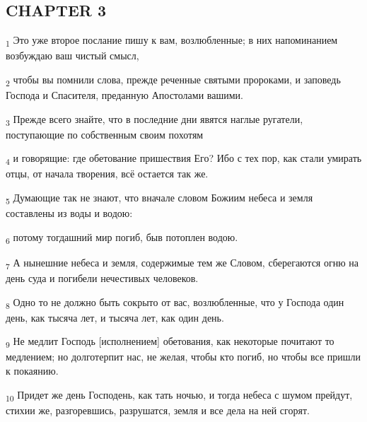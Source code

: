 \subsection{CHAPTER 3}
\begin{tcolorbox}
\textsubscript{1} Это уже второе послание пишу к вам, возлюбленные; в них напоминанием возбуждаю ваш чистый смысл,
\end{tcolorbox}
\begin{tcolorbox}
\textsubscript{2} чтобы вы помнили слова, прежде реченные святыми пророками, и заповедь Господа и Спасителя, преданную Апостолами вашими.
\end{tcolorbox}
\begin{tcolorbox}
\textsubscript{3} Прежде всего знайте, что в последние дни явятся наглые ругатели, поступающие по собственным своим похотям
\end{tcolorbox}
\begin{tcolorbox}
\textsubscript{4} и говорящие: где обетование пришествия Его? Ибо с тех пор, как стали умирать отцы, от начала творения, всё остается так же.
\end{tcolorbox}
\begin{tcolorbox}
\textsubscript{5} Думающие так не знают, что вначале словом Божиим небеса и земля составлены из воды и водою:
\end{tcolorbox}
\begin{tcolorbox}
\textsubscript{6} потому тогдашний мир погиб, быв потоплен водою.
\end{tcolorbox}
\begin{tcolorbox}
\textsubscript{7} А нынешние небеса и земля, содержимые тем же Словом, сберегаются огню на день суда и погибели нечестивых человеков.
\end{tcolorbox}
\begin{tcolorbox}
\textsubscript{8} Одно то не должно быть сокрыто от вас, возлюбленные, что у Господа один день, как тысяча лет, и тысяча лет, как один день.
\end{tcolorbox}
\begin{tcolorbox}
\textsubscript{9} Не медлит Господь [исполнением] обетования, как некоторые почитают то медлением; но долготерпит нас, не желая, чтобы кто погиб, но чтобы все пришли к покаянию.
\end{tcolorbox}
\begin{tcolorbox}
\textsubscript{10} Придет же день Господень, как тать ночью, и тогда небеса с шумом прейдут, стихии же, разгоревшись, разрушатся, земля и все дела на ней сгорят.
\end{tcolorbox}
